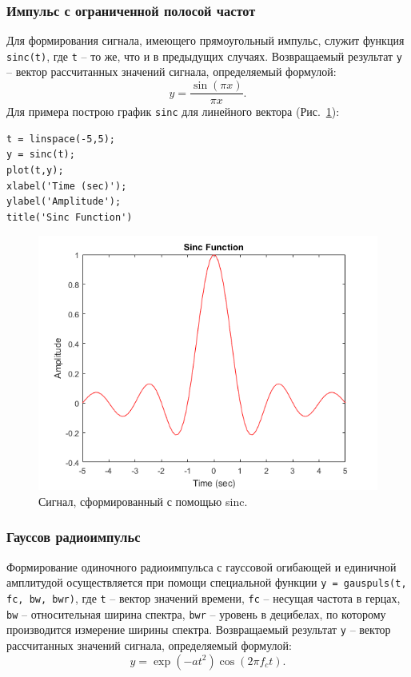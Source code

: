 \documentclass[12pt,a4paper]{article}
\begin{document}
\subsubsection{Импульс с ограниченной полосой частот}
Для формирования сигнала, имеющего прямоугольный импульс, служит функция \verb|sinc(t)|, где \verb|t| -- то же, что и в предыдущих случаях.
Возвращаемый результат \verb|y| -- вектор рассчитанных значений сигнала, определяемый формулой:
\begin{equation}
  y=\frac{\sin(\pi x)}{\pi x}.
\end{equation}
Для примера построю график \verb|sinc| для линейного вектора (Рис.~\ref{fig:img_sinc}):
\begin{verbatim}
t = linspace(-5,5);
y = sinc(t);
plot(t,y);
xlabel('Time (sec)');
ylabel('Amplitude');
title('Sinc Function')
\end{verbatim}
\begin{figure}[!ht]
  \centering
  \includegraphics[width=\linewidth]{img_sinc}
  \caption{Сигнал, сформированный с помощью sinc.}
  \label{fig:img_sinc}
\end{figure}

\subsubsection{Гауссов радиоимпульс}
Формирование одиночного радиоимпульса с гауссовой огибающей и единичной амплитудой осуществляется при помощи специальной функции \verb|y = gauspuls(t, fc, bw, bwr)|, где \verb|t| -- вектор значений времени, \verb|fc| -- несущая частота в герцах, \verb|bw| -- относительная ширина спектра, \verb|bwr| -- уровень в децибелах, по которому производится измерение ширины спектра.
Возвращаемый результат \verb|y| -- вектор рассчитанных значений сигнала, определяемый формулой:
\begin{equation} \label{eq:gaus}
  y=\exp(-at^2)\cos(2\pi f_c t).
\end{equation}
\end{document}
